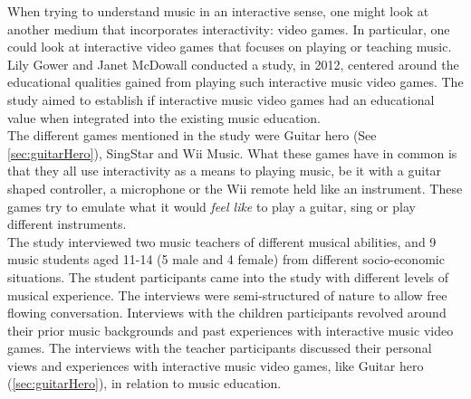 {\color{red}When trying to understand music in an interactive sense, one might look at another medium that incorporates interactivity: video games. In particular, one could look at interactive video games that focuses on playing or teaching music. Lily Gower and Janet McDowall conducted a study, in 2012, centered around the educational qualities gained from playing such interactive music video games\cite{interactiveMusicVideoGames}. The study aimed to establish if interactive music video games had an educational value when integrated into the existing music education.\\

The different games mentioned in the study were Guitar hero (See \autoref{sec:guitarHero}), SingStar and Wii Music. What these games have in common is that they all use interactivity as a means to playing music, be it with a guitar shaped controller, a microphone or the Wii remote held like an instrument. These games try to emulate what it would \textit{feel like} to play a guitar, sing or play different instruments.\\

The study interviewed two music teachers of different musical abilities, and 9 music students aged 11-14 (5 male and 4 female) from different socio-economic situations. The student participants came into the study with different levels of musical experience. The interviews were semi-structured of nature to allow free flowing conversation. Interviews with the children participants revolved around their prior music backgrounds and past experiences with interactive music video games. The interviews with the teacher participants discussed their personal views and experiences with interactive music video games, like Guitar hero (\autoref{sec:guitarHero}), in relation to music education.\\

}
